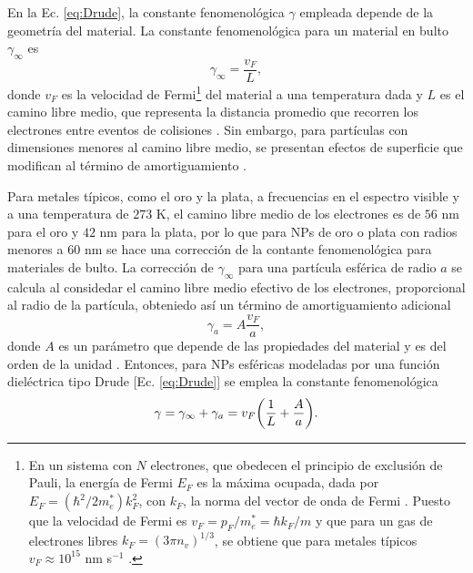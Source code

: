 \documentclass[letterpaper,11pt] {article}
\begin{document}
En la Ec.  \eqref{eq:Drude}, la constante fenomenológica $\gamma$	empleada depende de la geometría del material.  La constante fenomenológica para un material en bulto $\gamma_\infty$ es \cite{kreibig1995clusters} 
	\begin{equation*}
	\gamma_\infty = \frac{v_F}{L},
	\end{equation*}
donde $v_F$ es la velocidad de Fermi\footnote{En un sistema con $N$ electrones, que obedecen el principio  de exclusión de Pauli, la energía de Fermi $E_F$ es la máxima ocupada, dada por $E_F = (\hbar^2/2m_e^*)k_F^2$, con $k_F$, la norma del vector de onda de Fermi \cite{gross2014festkorperphysik}.  Puesto que la velocidad de Fermi es $v_F = p_F/m_e^* = \hbar k_F / m$ y que para un gas de electrones libres $k_F=(3\pi n_v)^{1/3}$, se obtiene que para metales típicos $v_F\approx 10^{15}$ nm s$^{-1}$ \cite{gross2014festkorperphysik}. } del material a una temperatura dada y $L$ es el camino libre medio, que representa la distancia promedio que recorren los electrones entre eventos de colisiones \cite{gross2014festkorperphysik}.  Sin embargo, para partículas con dimensiones menores al camino libre medio, se presentan efectos de superficie que modifican al término de amortiguamiento \cite{kreibig1995clusters}.  

Para metales típicos, como el oro y la plata, a frecuencias en el espectro visible y a una temperatura de $273$ K, el camino libre medio de los electrones es  de $56$ nm para el oro y $42$ nm para la plata, por lo que para NPs de oro o plata con radios menores a $60$ nm se hace una corrección de la contante fenomenológica para materiales de bulto. La corrección de $\gamma_\infty$ para una partícula esférica de radio $a$ se calcula al considedar el camino libre medio efectivo de los electrones, proporcional al radio de la partícula, obteniedo así un término de amortiguamiento adicional \cite{kreibig1995clusters}
	\begin{equation*}
	 \gamma_a= A \frac{v_F}{a},
	\end{equation*}
donde $A$ es un parámetro que depende de las propiedades del material y es del orden de la unidad \cite{kreibig1995clusters}.  Entonces, para NPs esféricas modeladas por una función dieléctrica tipo Drude [Ec.  \eqref{eq:Drude}] se emplea la constante fenomenológica
	\begin{equation}
	\gamma = \gamma_\infty + \gamma_a = v_F \qty(\frac{1}{L}+\frac{A}{a}). 
	\end{equation}
\end{document}
